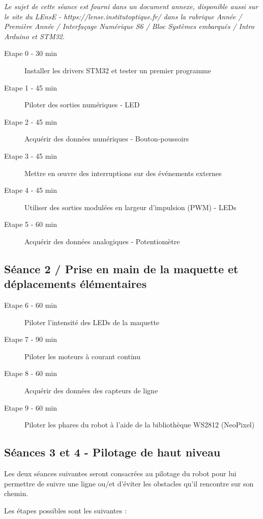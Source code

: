 \documentclass[a4paper,11pt,titlepage]{article} %
\begin{document}
\textit{Le sujet de cette séance est fourni dans un document annexe, disponible aussi sur le site du LEnsE - https://lense.institutoptique.fr/ dans la rubrique Année / Première Année / Interfaçage Numérique S6 / Bloc Systèmes embarqués / Intro Arduino et STM32.}

	\begin{description}
		\item[Etape 0 - 30 min] Installer les drivers STM32 et tester un premier programme
		\item[Etape 1 - 45 min] Piloter des sorties numériques - LED
		\item[Etape 2 - 45 min] Acquérir des données numériques - Bouton-poussoirs
		\item[Etape 3 - 45 min] Mettre en \oe{}uvre des interruptions sur des événements externes
		\item[Etape 4 - 45 min] Utiliser des sorties modulées en largeur d'impulsion (PWM) - LEDs
		\item[Etape 5 - 60 min] Acquérir des données analogiques - Potentiomètre
	\end{description}	


\subsection{Séance 2 / Prise en main de la maquette et déplacements élémentaires}

	\begin{description}
		\item[Etape 6 - 60 min] Piloter l'intensité des LEDs de la maquette
		\item[Etape 7 - 90 min] Piloter les moteurs à courant continu
		\item[Etape 8 - 60 min] Acquérir des données des capteurs de ligne				\item[Etape 9 - 60 min] Piloter les phares du robot à l'aide de la bibliothèque WS2812 (NeoPixel)
	\end{description}


\subsection{Séances 3 et 4 - Pilotage de haut niveau}

Les deux séances suivantes seront consacrées au pilotage du robot pour lui permettre de suivre une ligne ou/et d'éviter les obstacles qu'il rencontre sur son chemin.

Les étapes possibles sont les suivantes :
\end{document}
